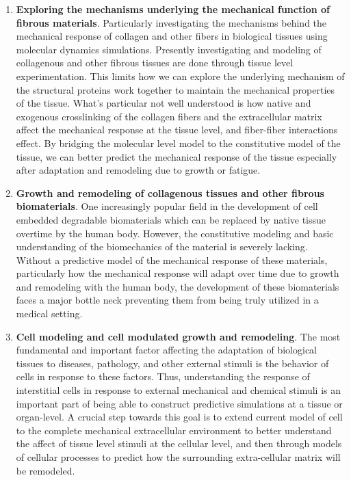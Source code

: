 \documentclass[11pt]{article}
\begin{document}
\begin{enumerate}

\item \textbf{Exploring the mechanisms underlying the mechanical function of fibrous materials}. Particularly investigating the mechanisms behind the mechanical response of collagen and other fibers in biological tissues using molecular dynamics simulations. Presently investigating and modeling of collagenous and other fibrous tissues are done through tissue level experimentation. This limits how we can explore the underlying mechanism of the structural proteins work together to maintain the mechanical properties of the tissue. What's particular not well understood is how native and exogenous crosslinking of the collagen fibers and the extracellular matrix affect the mechanical response at the tissue level, and fiber-fiber interactions effect. By bridging the molecular level model to the constitutive model of the tissue, we can better predict the mechanical response of the tissue especially after adaptation and remodeling due to growth or fatigue. 

\item \textbf{Growth and remodeling of collagenous tissues and other fibrous biomaterials}. One increasingly popular field in the development of cell embedded degradable biomaterials which can be replaced by native tissue overtime by the human body. However, the constitutive modeling and basic understanding of the biomechanics of the material is severely lacking. Without a predictive model of the mechanical response of these materials, particularly how the mechanical response will adapt over time due to growth and remodeling with the human body, the development of these biomaterials faces a major bottle neck preventing them from being truly utilized in a medical setting.

\item \textbf{Cell modeling and cell modulated growth and remodeling}. The most fundamental and important factor affecting the adaptation of biological tissues to diseases, pathology, and other external stimuli is the behavior of cells in response to these factors. Thus, understanding the response of interstitial cells in response to external mechanical and chemical stimuli is  an important part of being able to construct predictive simulations at a tissue or organ-level. A crucial step towards this goal is to extend current model of cell to the complete mechanical extracellular environment to better understand the affect of tissue level stimuli at the cellular level, and then through models of cellular processes to predict how the surrounding extra-cellular matrix will be remodeled.

\end{enumerate}
\end{document}
